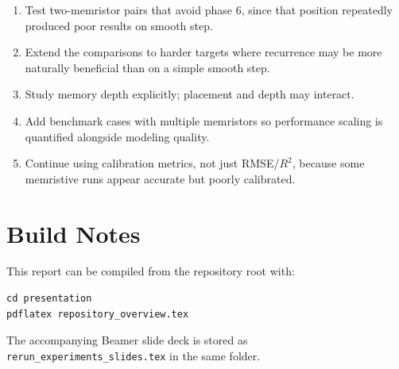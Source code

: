 \documentclass[11pt,a4paper]{article}
\begin{document}
\begin{enumerate}[leftmargin=*]
    \item Test two-memristor pairs that avoid phase 6, since that position repeatedly produced poor results on smooth step.
    \item Extend the comparisons to harder targets where recurrence may be more naturally beneficial than on a simple smooth step.
    \item Study memory depth explicitly; placement and depth may interact.
    \item Add benchmark cases with multiple memristors so performance scaling is quantified alongside modeling quality.
    \item Continue using calibration metrics, not just RMSE/$R^2$, because some memristive runs appear accurate but poorly calibrated.
\end{enumerate}

\section{Build Notes}

This report can be compiled from the repository root with:
\begin{verbatim}
cd presentation
pdflatex repository_overview.tex
\end{verbatim}

The accompanying Beamer slide deck is stored as \texttt{rerun\_experiments\_slides.tex} in the same folder.
\end{document}
